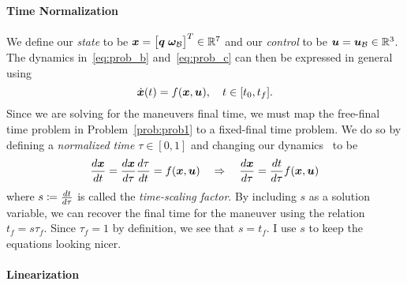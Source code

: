 \documentclass[10pt]{article}
\begin{document}
\paragraph{Time Normalization}
We define our \textit{state} to be $\bm{x} = \big[ \bm{q} \; \bm{\omega}_{\mathcal{B}} \big]^T \in {\mathbb{R}}^7$ and our \textit{control} to be $\bm{u} = \bm{u}_{\mathcal{B}} \in {\mathbb{R}}^3$. The dynamics in~\eqref{eq:prob_b} and~\eqref{eq:prob_c} can then be expressed in general using
\begin{equation}
\dot{\bm{x}}(t) = f(\bm{x},\bm{u}), \quad t \in [t_0,t_f].
\label{eq:dynamics_general}
\end{equation}
Since we are solving for the maneuvers final time, we must map the free-final time problem in Problem~\ref{prob:prob1} to a fixed-final time problem. We do so by defining a \textit{normalized time} $\tau\in[0,1]$ and changing our dynamics~ to be
\begin{equation}
\frac{d \bm{x}}{d t} = \frac{d \bm{x}}{d \tau}\frac{d \tau}{d t} = f(\bm{x},\bm{u}) \quad \Rightarrow \quad \frac{d \bm{x}}{d \tau} = \frac{d t}{d \tau} f(\bm{x},\bm{u})
\label{eq:dynamics_normalized}
\end{equation}
where $s \coloneqq \frac{d t}{d \tau}$ is called the \textit{time-scaling factor}. By including $s$ as a solution variable, we can recover the final time for the maneuver using the relation $t_f = s \tau_f$. Since $\tau_f = 1$ by definition, we see that $s = t_f$. I use $s$ to keep the equations looking nicer.

\paragraph{Linearization}
\end{document}

